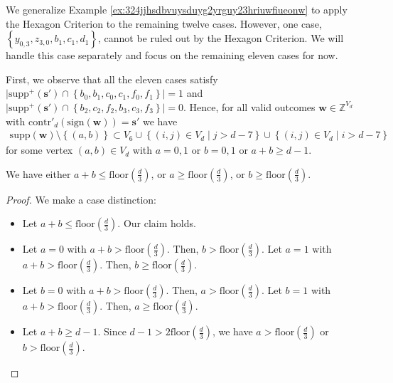 We generalize Example \ref{ex:324jjhsdbvuysduyg2yrguy23hriuwfiueonw} to apply the Hexagon Criterion to the remaining twelve cases. However, one case, \( \left\{ y_{0,3}, z_{3,0}, b_1, c_1, d_1 \right\} \), cannot be ruled out by the Hexagon Criterion. We will handle this case separately and focus on the remaining eleven cases for now.

First, we observe that all the eleven cases satisfy \( \lvert \mathrm{supp}^+(\mathbf{s}') \cap \left\{b_0, b_1, c_0, c_1, f_0, f_1 \right\} \rvert = 1 \) and \( \lvert \mathrm{supp}^+(\mathbf{s}') \cap \left\{b_2, c_2, f_2, b_3, c_3, f_3 \right\} \rvert = 0 \).
Hence, for all valid outcomes \( \mathbf{w} \in \mathbb{Z}^{V_d} \) with \( \mathrm{contr}'_d(\mathrm{sign}(\mathbf{w})) = \mathbf{s}' \) we have 
\begin{align*}
    \mathrm{supp}(\mathbf{w}) \setminus \left\{ (a,b) \right\} \subset V_6 \cup \left\{ (i,j) \in V_d \mid j > d - 7 \right\}  \cup \left\{ (i,j) \in V_d \mid i > d - 7 \right\} 
\end{align*}
for some vertex \( (a,b) \in V_d \) with \( a = 0,1 \) or \( b=0,1 \) or \( a + b \geq d-1 \).

\begin{proposition}\label{prop:nkjeai32huh3i2}
    We have either \( a + b \leq \mathrm{floor}(\frac{d}{3}) \), or \( a \geq \mathrm{floor}(\frac{d}{3}) \), or \( b \geq \mathrm{floor}(\frac{d}{3}) \).
\end{proposition}

\begin{proof}
    We make a case distinction: 
\begin{itemize}
    \item Let \( a + b \leq \mathrm{floor}(\frac{d}{3}) \). Our claim holds.
    \item Let \( a = 0 \) with \( a + b > \mathrm{floor}(\frac{d}{3}) \). Then, \( b > \mathrm{floor}(\frac{d}{3}) \). Let \( a = 1 \) with \( a + b > \mathrm{floor}(\frac{d}{3}) \). Then, \( b \geq \mathrm{floor}(\frac{d}{3}) \). 
    \item Let \( b = 0 \) with \( a + b > \mathrm{floor}(\frac{d}{3}) \). Then, \( a > \mathrm{floor}(\frac{d}{3}) \). Let \( b = 1 \) with \( a + b > \mathrm{floor}(\frac{d}{3}) \). Then, \( a \geq \mathrm{floor}(\frac{d}{3}) \). 
    \item Let \( a + b \geq d-1  \). Since \( d-1 > 2 \mathrm{floor}(\frac{d}{3}) \), we have \( a > \mathrm{floor}(\frac{d}{3}) \) or \( b > \mathrm{floor}(\frac{d}{3}) \).
\end{itemize}
\end{proof}

